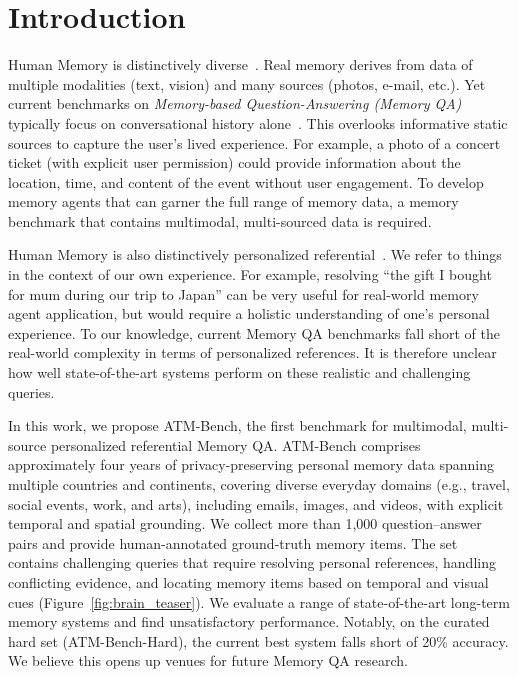 \documentclass{article}
\theoremstyle{plain}
\theoremstyle{definition}
\theoremstyle{remark}
\begin{document}
\section{Introduction}

Human Memory is distinctively diverse~\citep{Harvey2016RememberLifelog}. Real memory derives from data of multiple modalities (text, vision) and many sources (photos, e-mail, etc.). Yet current benchmarks on \textit{Memory-based Question-Answering (Memory QA)} typically focus on conversational history alone~\citep{Zhong2024MemoryBank, maharana2024locomo, du2024perltqa, wu2025longmemeval}. This overlooks informative static sources to capture the user's lived experience. For example, a photo of a concert ticket (with explicit user permission) could provide information about the location, time, and content of the event without user engagement. To develop memory agents that can garner the full range of memory data, a memory benchmark that contains multimodal, multi-sourced data is required.

Human Memory is also distinctively personalized referential~\citep{du2024perltqa, maharana2024locomo, tan2025membench}. We refer to things in the context of our own experience. For example, resolving ``the gift I bought for mum during our trip to Japan'' can be very useful for real-world memory agent application, but would require a holistic understanding of one's personal experience. To our knowledge, current Memory QA benchmarks fall short of the real-world complexity in terms of personalized references. It is therefore unclear how well state-of-the-art systems perform on these realistic and challenging queries.

In this work, we propose ATM-Bench, the first benchmark for multimodal, multi-source personalized referential Memory QA. ATM-Bench comprises approximately four years of privacy-preserving personal memory data spanning multiple countries and continents, covering diverse everyday domains (e.g., travel, social events, work, and arts), including emails, images, and videos, with explicit temporal and spatial grounding. We collect more than 1,000 question–answer pairs and provide human-annotated ground-truth memory items. The set contains challenging queries that require resolving personal references, handling conflicting evidence, and locating memory items based on temporal and visual cues (Figure~\ref{fig:brain_teaser}). We evaluate a range of state-of-the-art long-term memory systems and find unsatisfactory performance. Notably, on the curated hard set (ATM-Bench-Hard), the current best system falls short of 20\% accuracy. We believe this opens up venues for future Memory QA research. 
\end{document}
